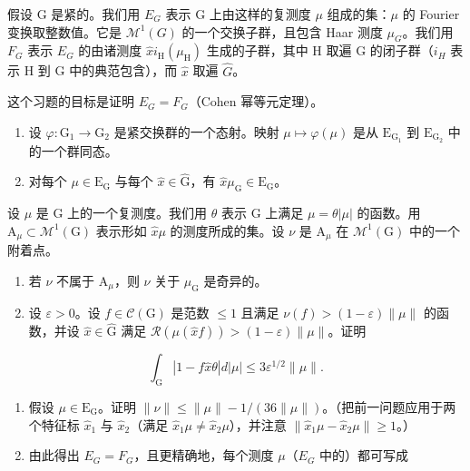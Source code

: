 假设 G 是紧的。我们用 \(E_{G}\) 表示 G 上由这样的复测度 \(\mu\) 组成的集：\(\mu\) 的 Fourier 变换取整数值。它是 \(\mathcal{M}^{1}(G)\) 的一个交换子群，且包含 Haar 测度 \(\mu_{G}\)。我们用 \(F_{G}\) 表示 \(E_{G}\) 的由诸测度 \(\widehat{x} i_{\mathrm{H}}(\mu_{\mathrm{H}})\) 生成的子群，其中 H 取遍 G 的闭子群（\(i_{H}\) 表示 H 到 G 中的典范包含），而 \(\widehat{x}\) 取遍 \(\widehat{G}\)。

  这个习题的目标是证明 \(E_{G} = F_{G}\)（Cohen 幂等元定理）。

\begin{enumerate}
\def\labelenumi{\alph{enumi})}
\item
  设 \(\varphi\colon\mathrm{G}_{1}\to\mathrm{G}_{2}\) 是紧交换群的一个态射。映射 \(\mu\mapsto\varphi(\mu)\) 是从 \(\mathrm{E}_{\mathrm{G}_{1}}\) 到 \(\mathrm{E}_{\mathrm{G}_{2}}\) 中的一个群同态。
\item
  对每个 \(\mu \in \mathrm{E}_{\mathrm{G}}\) 与每个 \(\widehat{x} \in \widehat{\mathrm{G}}\)，有 \(\widehat{x}\mu_{\mathrm{G}} \in \mathrm{E}_{\mathrm{G}}\)。
\end{enumerate}

  设 \(\mu\) 是 G 上的一个复测度。我们用 \(\theta\) 表示 G 上满足 \(\mu = \theta |\mu|\) 的函数。用 \(\mathrm{A}_{\mu} \subset \mathcal{M}^{1}(\mathrm{G})\) 表示形如 \(\widehat{x}\mu\) 的测度所成的集。设 \(\nu\) 是 \(\mathrm{A}_{\mu}\) 在 \(\mathcal{M}^{1}(\mathrm{G})\) 中的一个附着点。

\begin{enumerate}
\def\labelenumi{\alph{enumi})}
\setcounter{enumi}{2}
\tightlist
\item
  若 \(\nu\) 不属于 \(\mathrm{A}_{\mu}\)，则 \(\nu\) 关于 \(\mu_{\mathrm{G}}\) 是奇异的。\\
\item
  设 \(\varepsilon > 0\)。设 \(f \in \mathcal{C}(\mathrm{G})\) 是范数 \(\leqslant 1\) 且满足 \(\nu(f) > (1 - \varepsilon)\|\mu\|\) 的函数，并设 \(\widehat{x} \in \widehat{\mathrm{G}}\) 满足 \(\mathcal{R}(\mu(\widehat{x} f)) > (1 - \varepsilon)\|\mu\|\)。证明
\end{enumerate}

\[
\int_ {\mathrm{G}} | 1 - f \widehat {x} \theta | d | \mu | \leqslant 3 \varepsilon^ {1 / 2} \| \mu \|.
\]

\begin{enumerate}
\def\labelenumi{\alph{enumi})}
\setcounter{enumi}{4}
\item
  假设 \(\mu \in \mathrm{E}_{\mathrm{G}}\)。证明 \(\| \nu \| \leqslant \| \mu \| - 1 / (36 \| \mu \|)\)。（把前一问题应用于两个特征标 \(\widehat{x}_1\) 与 \(\widehat{x}_2\)（满足 \(\widehat{x}_1 \mu \neq \widehat{x}_2 \mu\)），并注意 \(\| \widehat{x}_1 \mu - \widehat{x}_2 \mu \| \geqslant 1\)。）
\item
  由此得出 \(E_{G} = F_{G}\)，且更精确地，每个测度 \(\mu\)（\(E_{G}\) 中的）都可写成
\end{enumerate}

